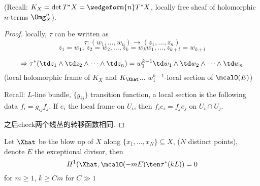 (Recall: $K_X=\det T^*X=\wedgeform{n}T^*X$, 
locally free sheaf of holomorphic $n$-terms $\Omg_X^n$).

\begin{proof}
locally, $\tau$ can be written as
$$\tau:(w_1,...,w_n)\to (z_1,...,z_n)$$
$$z_1=w_1,\,z_2=w_2,...,z_k=w_kw_1,...,z_{k+l}=w_{k+l}$$

$$
  \Rightarrow
  \tau^*(\td z_1\wedge\td z_2\wedge\cdots\wedge\td z_n)
= w_1^{k-1}\td w_1\wedge\td w_2\wedge\cdots\wedge\td w_n
$$
(local holomorphic frame of $K_X$ and $K_{\Xhat}$...
$w_1^{k-1}$-local section of $\mcalO(E)$)


Recall: $L$-line bundle, $\{g_{ij}\}$ transition function,
a local section is the following data
$f_i=g_{ij}f_j$. If $e_i$ the local frame on $U_i$, then
$f_ie_i=f_je_j$ on $U_i\cap U_j$.

之后check两个线丛的转移函数相同.
\end{proof}



\begin{lemma}Let $\Xhat$ be the blow up of $X$ along
$\{x_1,...,x_N\}\subseteq X$, ($N$ distinct points),
denote $E$ the exceptional divisor, then
$$
  H^1(\Xhat,\mcalO(-mE)\ten\tau^*(kL))=0
$$
for $m\geq 1$, $k\geq Cm$ for $C\gg 1$
\end{lemma}

